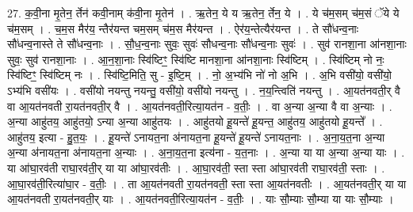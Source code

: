 \documentclass[17pt]{extarticle}
\begin{document}
27. क॒वी॒ना मृ॒तेन॒ र्तेन॑ कवी॒नाम् क॑वी॒ना मृ॒तेन॑ । . ऋ॒तेन॒ ये य ऋ॒तेन॒ र्तेन॒ ये । . ये च॑म॒सम् च॑म॒सं ॅये ये च॑म॒सम् । . च॒म॒स मैर॑य॒ न्तैर॑यन्त चम॒सम् च॑म॒स मैर॑यन्त । . ऐर॑य॒न्तेत्यैर॑यन्त । . ते सौ॑धन्व॒नाः सौ॑धन्व॒नास्ते ते सौ॑धन्व॒नाः । . सौ॒ध॒न्व॒नाः सुवः॒ सुवः॑ सौधन्व॒नाः सौ॑धन्व॒नाः सुवः॑ । . सुव॑ रानशा॒ना आ॑नशा॒नाः सुवः॒ सुव॑ रानशा॒नाः । . आ॒न॒शा॒नाः स्वि॑ष्टिꣳ॒॒ स्वि॑ष्टि मानशा॒ना आ॑नशा॒नाः स्वि॑ष्टिम् । . स्वि॑ष्टिम् नो नः॒ स्वि॑ष्टिꣳ॒॒ स्वि॑ष्टिम् नः । . स्वि॑ष्टि॒मिति॒ सु - इ॒ष्टि॒म् । . नो॒ अ॒भ्य॑भि नो॑ नो अ॒भि । . अ॒भि वसी॑यो॒ वसी॑यो॒ ऽभ्य॑भि वसी॑यः । . वसी॑यो नयन्तु नयन्तु॒ वसी॑यो॒ वसी॑यो नयन्तु । . न॒य॒न्त्विति॑ नयन्तु । . आ॒यत॑नवती॒र् वै वा आ॒यत॑नवती रा॒यत॑नवती॒र् वै । . आ॒यत॑नवती॒रित्या॒यत॑न - व॒तीः॒ । . वा अ॒न्या अ॒न्या वै वा अ॒न्याः । . अ॒न्या आहु॑तय॒ आहु॑तयो॒ ऽन्या अ॒न्या आहु॑तयः । . आहु॑तयो हू॒यन्ते॑ हू॒यन्त॒ आहु॑तय॒ आहु॑तयो हू॒यन्ते᳚ । . आहु॑तय॒ इत्या - हु॒त॒यः॒ । . हू॒यन्ते॑ ऽनायत॒ना अ॑नायत॒ना हू॒यन्ते॑ हू॒यन्ते॑ ऽनायत॒नाः । . अ॒ना॒य॒त॒ना अ॒न्या अ॒न्या अ॑नायत॒ना अ॑नायत॒ना अ॒न्याः । . अ॒ना॒य॒त॒ना इत्य॑ना - य॒त॒नाः । . अ॒न्या या या अ॒न्या अ॒न्या याः । . या आ॑घा॒रव॑ती राघा॒रव॑ती॒र् या या आ॑घा॒रव॑तीः । . आ॒घा॒रव॑ती॒ स्ता स्ता आ॑घा॒रव॑ती राघा॒रव॑ती॒ स्ताः । . आ॒घा॒रव॑ती॒रित्या॑घा॒र - व॒तीः॒ । . ता आ॒यत॑नवती रा॒यत॑नवती॒ स्ता स्ता आ॒यत॑नवतीः । . आ॒यत॑नवती॒र् या या आ॒यत॑नवती रा॒यत॑नवती॒र् याः । . आ॒यत॑नवती॒रित्या॒यत॑न - व॒तीः॒ । . याः सौ॒म्याः सौ॒म्या या याः सौ॒म्याः । \newline
\end{document}
